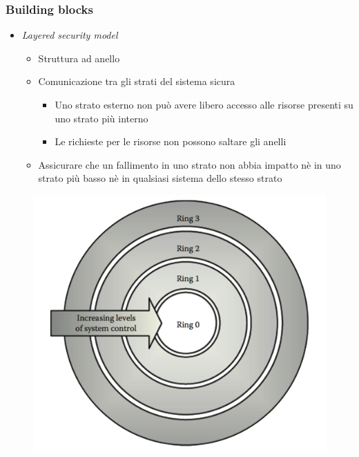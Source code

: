 \begin{frame}
  \frametitle{Building blocks}
  \begin{itemize}[<+- | alert@+>]
  \item \textit{Layered security model}
  \begin{itemize}
  \item Struttura ad anello 
  \item Comunicazione tra gli strati del sistema sicura
	  \begin{itemize}
  	\item Uno strato esterno non può avere libero accesso alle risorse presenti su uno strato più interno
  	\item Le richieste per le risorse non possono saltare gli anelli
  	\end{itemize}
  \item Assicurare che un fallimento in uno strato non abbia impatto nè in uno strato più basso nè in qualsiasi sistema dello stesso strato
  \end{itemize}
  \end{itemize}
    	\begin{figure}[h] 
		\includegraphics[scale=0.15]{imgs/ring.png}
	\end{figure}
\end{frame}

